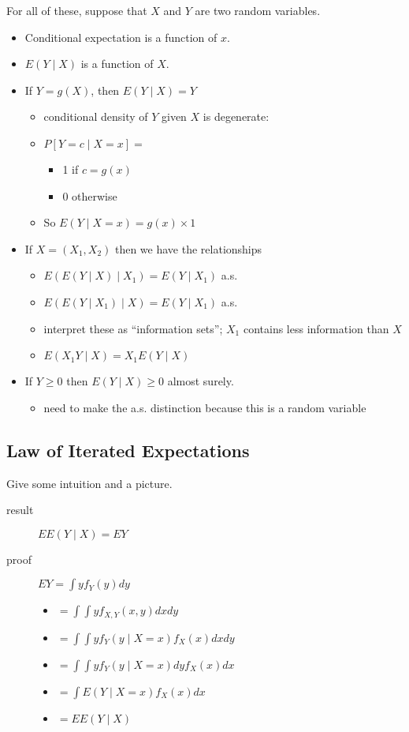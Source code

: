      For all of these, suppose that $X$ and $Y$ are two random variables.
\begin{itemize}
\item Conditional expectation is a function of $x$.
\item $E(Y \mid X)$ is a function of $X$.
\item If $Y = g(X)$, then $E(Y \mid X) = Y$
\begin{itemize}
\item conditional density of $Y$ given $X$ is degenerate:
\item $P[Y = c \mid X = x] =$
\begin{itemize}
\item 1 if $c = g(x)$
\item 0 otherwise
\end{itemize}
\item So $E(Y \mid X = x) = g(x) \times 1$
\end{itemize}
\item If $X = (X_1, X_2)$ then we have the relationships
\begin{itemize}
\item $E(E(Y \mid X) \mid X_1) = E(Y \mid X_1)$ a.s.
\item $E(E(Y \mid X_1) \mid X) = E(Y \mid X_1)$ a.s.
\item interpret these as ``information sets''; $X_1$ contains
          less information than $X$
\item $E(X_1 Y \mid X) = X_1 E(Y \mid X)$
\end{itemize}
\item If $Y \geq 0$ then $E(Y \mid X) \geq 0$ almost surely.
\begin{itemize}
\item need to make the a.s. distinction because this is a random variable
\end{itemize}
\end{itemize}

\subsection{Law of Iterated Expectations}

     Give some intuition and a picture.
\begin{description}
\item[result] $E E(Y \mid X) = E Y$
\item[proof] $E Y = \int y f_Y(y) dy$
\begin{itemize}
\item $= \int \int y f_{X,Y}(x,y) dx dy$
\item $= \int \int y f_Y(y \mid X = x) f_X(x) dx dy$
\item $= \int \int y f_Y(y \mid X = x) dy f_X(x) dx$
\item $= \int E(Y \mid X = x) f_X(x) dx$
\item $= E E(Y \mid X)$
\end{itemize}
\end{description}

